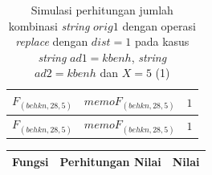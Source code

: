 \begin{appendices}
\begin{table}[H]
\begin{tabular} {|p{3cm}|p{5cm}|p{1cm}|}
  		$ F_{(behkn, 28, 5)}  $ & $memoF_{(behkn, 28, 5)}$ & $ 1 $ \\ \hline
  		$ F_{(behkn, 28, 5)}  $ & $memoF_{(behkn, 28, 5)}$ & $ 1 $ \\ \hline
  	\end{tabular}\caption{Simulasi perhitungan jumlah kombinasi \textit{string} $ orig1 $ dengan operasi \textit{replace} dengan $ dist= 1  $ pada kasus \textit{string} $ ad1=kbenh $, \textit{string} $ ad2=kbenh $ dan $ X=5 $ (1)}
  	\label{tab:g_3_orig1_1_1}
  \end{table}
  \begin{table}[H]
  	\centering
  	\begin{tabular} {|p{3cm}|p{5cm}|p{1cm}|} \hline
  		Fungsi & Perhitungan Nilai & Nilai \\ \hline		
  		

\end{tabular}
\end{table}
\end{appendices}
